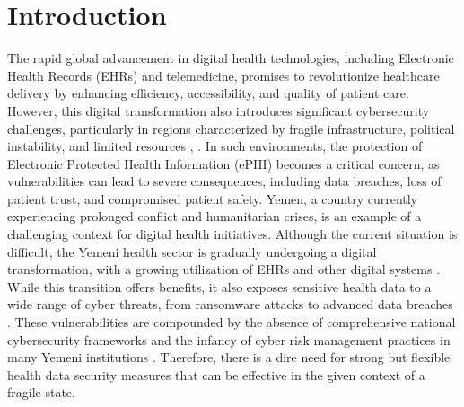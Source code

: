 \documentclass[12pt, a4paper, oneside]{report}
\begin{document}
	
	\tableofcontents   
	\listoffigures    
	\listoftables     
	\newpage
	
	
	
	
	\chapter{Introduction} 
	The rapid global advancement in digital health technologies, including Electronic Health Records (EHRs) and telemedicine, promises to revolutionize healthcare delivery by enhancing efficiency, accessibility, and quality of patient care. However, this digital transformation also introduces significant cybersecurity challenges, particularly in regions characterized by fragile infrastructure, political instability, and limited resources \cite{alhammadi2024advancing}, \cite{al2025political}. In such environments, the protection of Electronic Protected Health Information (ePHI) becomes a critical concern, as vulnerabilities can lead to severe consequences, including data breaches, loss of patient trust, and compromised patient safety.
	Yemen, a country currently experiencing prolonged conflict and humanitarian crises, is an example of a challenging context for digital health initiatives. Although the current situation is difficult, the Yemeni health sector is gradually undergoing a digital transformation, with a growing utilization of EHRs and other digital systems \cite{alhammadi2024advancing}. While this transition offers benefits, it also exposes sensitive health data to a wide range of cyber threats, from ransomware attacks to advanced data breaches \cite{abdulrab2021assessing}. These vulnerabilities are compounded by the absence of comprehensive national cybersecurity frameworks and the infancy of cyber risk management practices in many Yemeni institutions \cite{al2023information}. Therefore, there is a dire need for strong but flexible health data security measures that can be effective in the given context of a fragile state.
	
\end{document}

